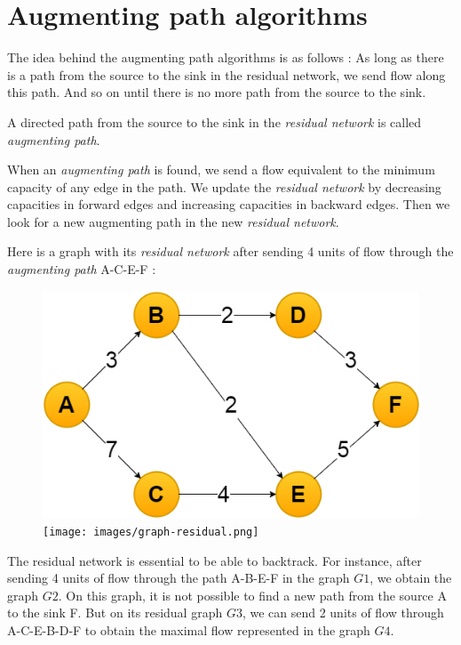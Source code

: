 \section{Augmenting path algorithms}
The idea behind the augmenting path algorithms is as follows : 
As long as there is a path from the source to the sink in the residual network, we send flow along this path. And so on until there is no more path from the source to the sink.\newline

A directed path from the source to the sink in the \textit{residual network} is called \textit{augmenting path}. \newline

When an \textit{augmenting path} is found, we send a flow equivalent to the minimum capacity of any edge in the path. We update the \textit{residual network} by decreasing capacities in forward edges and increasing capacities in backward edges. Then we look for a new augmenting path in the new \textit{residual network}. \newline

Here is a graph with its \textit{residual network} after sending 4 units of flow through the \textit{augmenting path} A-C-E-F : \newline

\begin{figure}[!h]
\includegraphics[scale=0.4]{images/graph.png}\hfill
\texttt{[image: images/graph-residual.png]}
\end{figure}
\newpage
The residual network is essential to be able to backtrack. For instance, after sending 4 units of flow through the path A-B-E-F in the graph $G1$, we obtain the graph $G2$. On this graph, it is not possible to find a new path from the source A to the sink F. But on its residual graph $G3$, we can send 2 units of flow through A-C-E-B-D-F to obtain the maximal flow represented in the graph $G4$.


